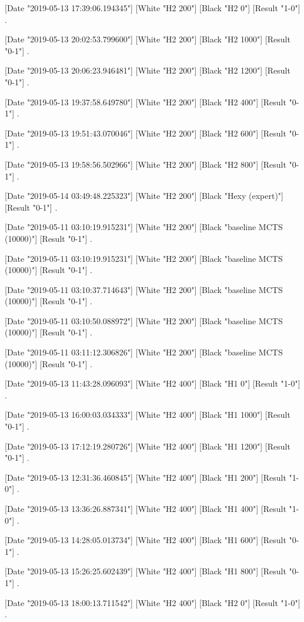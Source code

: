 {[Date "2019-05-13 17:39:06.194345"]
[White "H2 200"]
[Black "H2 0"]
[Result "1-0"]
.

[Date "2019-05-13 20:02:53.799600"]
[White "H2 200"]
[Black "H2 1000"]
[Result "0-1"]
.

[Date "2019-05-13 20:06:23.946481"]
[White "H2 200"]
[Black "H2 1200"]
[Result "0-1"]
.

[Date "2019-05-13 19:37:58.649780"]
[White "H2 200"]
[Black "H2 400"]
[Result "0-1"]
.

[Date "2019-05-13 19:51:43.070046"]
[White "H2 200"]
[Black "H2 600"]
[Result "0-1"]
.

[Date "2019-05-13 19:58:56.502966"]
[White "H2 200"]
[Black "H2 800"]
[Result "0-1"]
.

[Date "2019-05-14 03:49:48.225323"]
[White "H2 200"]
[Black "Hexy (expert)"]
[Result "0-1"]
.

[Date "2019-05-11 03:10:19.915231"]
[White "H2 200"]
[Black "baseline MCTS (10000)"]
[Result "0-1"]
.

[Date "2019-05-11 03:10:19.915231"]
[White "H2 200"]
[Black "baseline MCTS (10000)"]
[Result "0-1"]
.

[Date "2019-05-11 03:10:37.714643"]
[White "H2 200"]
[Black "baseline MCTS (10000)"]
[Result "0-1"]
.

[Date "2019-05-11 03:10:50.088972"]
[White "H2 200"]
[Black "baseline MCTS (10000)"]
[Result "0-1"]
.

[Date "2019-05-11 03:11:12.306826"]
[White "H2 200"]
[Black "baseline MCTS (10000)"]
[Result "0-1"]
.

[Date "2019-05-13 11:43:28.096093"]
[White "H2 400"]
[Black "H1 0"]
[Result "1-0"]
.

[Date "2019-05-13 16:00:03.034333"]
[White "H2 400"]
[Black "H1 1000"]
[Result "0-1"]
.

[Date "2019-05-13 17:12:19.280726"]
[White "H2 400"]
[Black "H1 1200"]
[Result "0-1"]
.

[Date "2019-05-13 12:31:36.460845"]
[White "H2 400"]
[Black "H1 200"]
[Result "1-0"]
.

[Date "2019-05-13 13:36:26.887341"]
[White "H2 400"]
[Black "H1 400"]
[Result "1-0"]
.

[Date "2019-05-13 14:28:05.013734"]
[White "H2 400"]
[Black "H1 600"]
[Result "0-1"]
.

[Date "2019-05-13 15:26:25.602439"]
[White "H2 400"]
[Black "H1 800"]
[Result "0-1"]
.

[Date "2019-05-13 18:00:13.711542"]
[White "H2 400"]
[Black "H2 0"]
[Result "1-0"]
.

}
